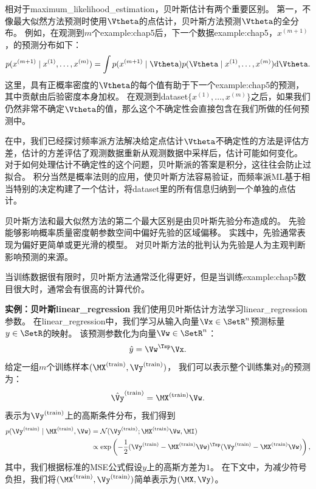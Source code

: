 相对于\gls{maximum_likelihood_estimation}，贝叶斯估计有两个重要区别。
第一，不像最大似然方法预测时使用$\Vtheta$的点估计，贝叶斯方法预测$\Vtheta$的全分布。
例如，在观测到$m$个\gls{example:chap5}后，下一个数据\gls{example:chap5}，$x^{(m+1)}$，的预测分布如下：
\begin{equation}
    p(x^{(m+1)} \mid x^{(1)},\dots,x^{(m)}) = 
    \int p(x^{(m+1)} \mid \Vtheta) p(\Vtheta \mid x^{(1)},\dots,x^{(m)}) 
        \mathrm{d}\Vtheta .
\end{equation}
这里，具有正概率密度的$\Vtheta$的每个值有助于下一个\gls{example:chap5}的预测，其中贡献由后验密度本身加权。
在观测到\gls{dataset}$\{ x^{(1)},\dots,x^{(m)}\}$之后，如果我们仍然非常不确定$\Vtheta$的值，那么这个不确定性会直接包含在我们所做的任何预测中。


在中，我们已经探讨频率派方法解决给定点估计$\Vtheta$不确定性的方法是评估方差，估计的方差评估了观测数据重新从观测数据中采样后，估计可能如何变化。
对于如何处理估计不确定性的这个问题，贝叶斯派的答案是积分，这往往会防止过拟合。
积分当然是概率法则的应用，使贝叶斯方法容易验证，而频率派\gls{ML}基于相当特别的决定构建了一个估计，将\gls{dataset}里的所有信息归纳到一个单独的点估计。

贝叶斯方法和最大似然方法的第二个最大区别是由贝叶斯先验分布造成的。
先验能够影响概率质量密度朝参数空间中偏好先验的区域偏移。
实践中，先验通常表现为偏好更简单或更光滑的模型。
对贝叶斯方法的批判认为先验是人为主观判断影响预测的来源。

当训练数据很有限时，贝叶斯方法通常泛化得更好，但是当训练\gls{example:chap5}数目很大时，通常会有很高的计算代价。

\textbf{实例：贝叶斯\gls{linear_regression}} \quad 我们使用贝叶斯估计方法学习\gls{linear_regression}参数。
在\gls{linear_regression}中，我们学习从输入向量$\Vx\in\SetR^n$预测标量$y\in\SetR$的映射。
该预测参数化为向量$\Vw \in \SetR^n$：
\begin{equation}
    \hat{y} = \Vw^\Tsp \Vx .
\end{equation}
给定一组$m$个训练样本$(\MX^{(\text{train})}, \Vy^{(\text{train})})$，
我们可以表示整个训练集对$y$的预测为：
\begin{equation}
    \hat{\Vy}^{(\text{train})} = \MX^{(\text{train})} \Vw .
\end{equation}
表示为$\Vy^{(\text{train})}$上的高斯条件分布，我们得到
\begin{align}
    p(\Vy^{(\text{train})} \mid \MX^{(\text{train})}, \Vw) &= 
    \mathcal{N}( \Vy^{(\text{train})}; \MX^{(\text{train})}\Vw, \MI ) \\
    & \propto \exp\left( 
        -\frac{1}{2}( \Vy^{(\text{train})} - \MX^{(\text{train})}\Vw )^\Tsp
        ( \Vy^{(\text{train})} - \MX^{(\text{train})}\Vw )
    \right),
\end{align}
其中，我们根据标准的MSE公式假设$y$上的高斯方差为$1$。
在下文中，为减少符号负担，我们将$(\MX^{(\text{train})}, \Vy^{(\text{train})})$简单表示为$(\MX, \Vy)$。

